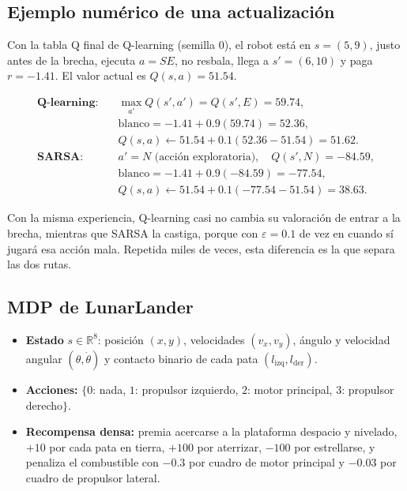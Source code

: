 \documentclass[11pt]{article}
\begin{document}
\subsection{Ejemplo numérico de una actualización}

Con la tabla Q final de Q-learning (semilla 0), el robot está en $s = (5,9)$,
justo antes de la brecha, ejecuta $a = SE$, no resbala, llega a $s' = (6,10)$ y
paga $r = -1.41$. El valor actual es $Q(s,a) = 51.54$.

\begin{align*}
\textbf{Q-learning:}\quad & \max_{a'} Q(s',a') = Q(s', E) = 59.74,\\
& \text{blanco} = -1.41 + 0.9(59.74) = 52.36,\\
& Q(s,a) \leftarrow 51.54 + 0.1(52.36 - 51.54) = \mathbf{51.62}.\\[6pt]
\textbf{SARSA:}\quad & a' = N \text{ (acción exploratoria)},\quad Q(s', N) = -84.59,\\
& \text{blanco} = -1.41 + 0.9(-84.59) = -77.54,\\
& Q(s,a) \leftarrow 51.54 + 0.1(-77.54 - 51.54) = \mathbf{38.63}.
\end{align*}

Con la misma experiencia, Q-learning casi no cambia su valoración de entrar a la
brecha, mientras que SARSA la castiga, porque con $\varepsilon = 0.1$ de vez en
cuando sí jugará esa acción mala. Repetida miles de veces, esta diferencia es la
que separa las dos rutas.

\subsection{MDP de LunarLander}

\begin{itemize}
    \item \textbf{Estado} $s \in \mathbb{R}^8$: posición $(x, y)$, velocidades
    $(v_x, v_y)$, ángulo y velocidad angular $(\theta, \dot\theta)$ y contacto
    binario de cada pata $(l_{\text{izq}}, l_{\text{der}})$.
    \item \textbf{Acciones:} $\{0$: nada, $1$: propulsor izquierdo, $2$: motor
    principal, $3$: propulsor derecho$\}$.
    \item \textbf{Recompensa densa:} premia acercarse a la plataforma despacio y
    nivelado, $+10$ por cada pata en tierra, $+100$ por aterrizar, $-100$ por
    estrellarse, y penaliza el combustible con $-0.3$ por cuadro de motor
    principal y $-0.03$ por cuadro de propulsor lateral.
\end{itemize}
\end{document}

